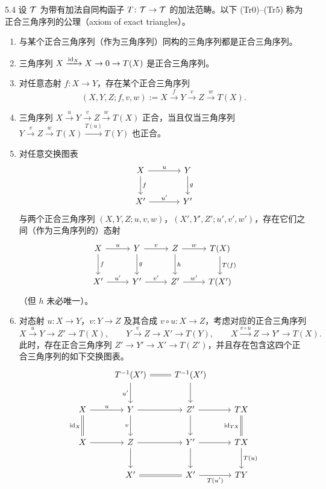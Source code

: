 \begin{definition}{5.4}
设 $\mathcal{T}$ 为带有加法自同构函子 $T\colon\mathcal{T}\to\mathcal{T}$ 的加法范畴。以下 (Tr0)–(Tr5) 称为正合三角序列的公理（axiom of exact triangles）。
\begin{enumerate}[start=0, label=(Tr\arabic*), leftmargin=4.6em, itemsep=0.35em]
\item 与某个正合三角序列（作为三角序列）同构的三角序列都是正合三角序列。
\item 三角序列 $X \xrightarrow{\mathrm{id}_X} X \to 0 \to T(X)$ 是正合三角序列。
\item 对任意态射 $f\colon X\to Y$，存在某个正合三角序列
\[
(X,Y,Z;f,v,w) := X \xrightarrow{\,f\,} Y \xrightarrow{\,v\,} Z \xrightarrow{\,w\,} T(X).
\]
\item 三角序列 $X \xrightarrow{u} Y \xrightarrow{v} Z \xrightarrow{w} T(X)$ 正合，当且仅当三角序列 $Y \xrightarrow{v} Z \xrightarrow{w} T(X) \xrightarrow{T(u)} T(Y)$ 也正合。
\item 对任意交换图表
\[
\begin{tikzcd}[row sep=2.2em, column sep=3.6em]
X \arrow[r,"u"] \arrow[d,"f"] & Y \arrow[d,"g"] \\
X' \arrow[r,"u'"] & Y'
\end{tikzcd}
\]
与两个正合三角序列 $(X,Y,Z;u,v,w)$，$(X',Y',Z';u',v',w')$，存在它们之间（作为三角序列的）态射
\[
\begin{tikzcd}[row sep=2.2em, column sep=2.6em]
X \arrow[r,"u"] \arrow[d,"f"] & Y \arrow[r,"v"] \arrow[d,"g"] & Z \arrow[r,"w"] \arrow[d,"h"] & T(X) \arrow[d,"T(f)"] \\
X' \arrow[r,"u'"] & Y' \arrow[r,"v'"] & Z' \arrow[r,"w'"] & T(X')
\end{tikzcd}
\]
（但 $h$ 未必唯一）。
\item 对态射 $u\colon X\to Y$，$v\colon Y\to Z$ 及其合成 $v\circ u\colon X\to Z$，考虑对应的正合三角序列
\[
X \xrightarrow{u} Y \to Z' \to T(X),\qquad
Y \xrightarrow{v} Z \to X' \to T(Y),\qquad
X \xrightarrow{v\circ u} Z \to Y' \to T(X).
\]
此时，存在正合三角序列 $Z'\to Y'\to X'\to T(Z')$，并且存在包含这四个正合三角序列的如下交换图表。
\[
\begin{tikzcd}[row sep=2.4em, column sep=2.5em]
{} & T^{-1}(X') \arrow[r,equal] \arrow[d,"u'"'] & T^{-1}(X') \arrow[d] & {} \\
X \arrow[r,"u"] \arrow[d,equal,"\id_X"'] & Y \arrow[r] \arrow[d,"v"'] & Z' \arrow[r] \arrow[d] & TX \arrow[d,equal,"\id_{TX}"'] \\
X \arrow[r] & Z \arrow[r] \arrow[d] & Y' \arrow[r] \arrow[d] & TX \arrow[d,"T(u)"] \\
{} & X' \arrow[r,equal] & X' \arrow[r,"T(u')"'] & TY
\end{tikzcd}
\]
\end{enumerate}
\end{definition}

